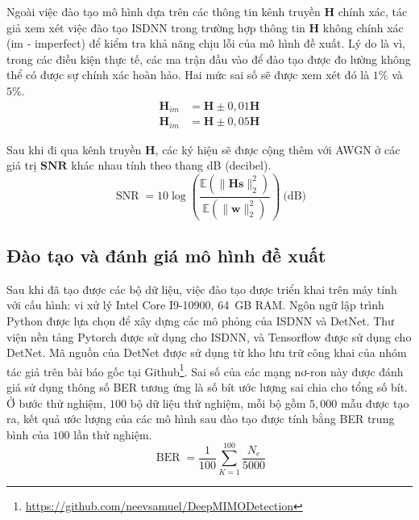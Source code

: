 Ngoài việc đào tạo mô hình dựa trên các thông tin kênh truyền $\mathbf{H}$ chính xác, tác giả xem xét việc đào tạo ISDNN trong trường hợp thông tin $\mathbf{H}$ không chính xác (im - imperfect) để kiểm tra khả năng chịu lỗi của mô hình đề xuất. Lý do là vì, trong các điều kiện thực tế, các ma trận đầu vào để đào tạo được đo lường không thể có được sự chính xác hoàn hảo. Hai mức sai số sẽ được xem xét đó là $1\%$ và $5\%$.
\begin{equation}
\begin{aligned}
     \mathbf{H}_{im} &= \mathbf{H} \pm 0,01\mathbf{H} \\
     \mathbf{H}_{im} &= \mathbf{H} \pm 0,05\mathbf{H}
\end{aligned}
\end{equation}

Sau khi đi qua kênh truyền $\mathbf{H}$, các ký hiệu sẽ được cộng thêm với AWGN ở các giá trị $\mathbf{SNR}$ khác nhau tính theo thang dB (decibel). 
\begin{equation}
\operatorname{SNR} = 10 \log \left(\frac{\mathbb{E}\left(\|\mathbf{H s}\|_2^2\right)}{\mathbb{E}\left(\|\mathbf{w}\|_2^2\right)}\right)~\text{(dB)}
\end{equation}

\subsection{Đào tạo và đánh giá mô hình đề xuất}

Sau khi đã tạo được các bộ dữ liệu, việc đào tạo được triển khai trên máy tính với cấu hình: vi xử lý Intel Core I9-10900, 64~GB RAM. Ngôn ngữ lập trình Python được lựa chọn để xây dựng các mô phỏng của ISDNN và DetNet. Thư viện nền tảng Pytorch được sử dụng cho ISDNN, và Tensorflow được sử dụng cho DetNet. Mã nguồn của DetNet được sử dụng từ kho lưu trữ công khai của nhóm tác giả trên bài báo gốc tại Github\footnote{\url{https://github.com/neevsamuel/DeepMIMODetection}}. Sai số của các mạng nơ-ron này được đánh giá sử dụng thông số BER tương ứng là số bít ước lượng sai chia cho tổng số bít. Ở bước thử nghiệm, $100$ bộ dữ liệu thử nghiệm, mỗi bộ gồm $5,000$ mẫu được tạo ra, kết quả ước lượng của các mô hình sau đào tạo được tính bằng BER trung bình của $100$ lần thử nghiệm.
\begin{equation}
    \operatorname{BER} = \frac{1}{100} \sum_{K=1}^{100} \frac{N_e}{5000}
\end{equation}


